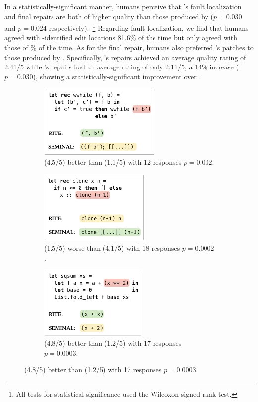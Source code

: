 %
In a statistically-significant manner, humans perceive that
\toolname's fault localization and final repairs are both
of higher quality than those produced by \seminal ($p=0.030$
and $p=0.024$ respectively).~\footnote{All tests for statistical
significance used the Wilcoxon signed-rank test.}
%
Regarding fault localization, we find that humans agreed
with \toolname-identified edit locations 81.6\% of the time
but only agreed with those of \% of the time.
%
%
As for the final repair, humans also preferred \toolname's patches
to those produced by \seminal. Specifically, \toolname's repairs
achieved an average quality rating of 2.41/5 while \seminal's
repairs had an average rating of only 2.11/5, a 14\% increase ($p=0.030$),
showing a statistically-significant improvement over \seminal.

\begin{figure}
\begin{subfigure}[t]{.33\textwidth}
\centering
\includegraphics[height=1.4in]{comp1.png}
\caption{\toolname (4.5/5) better than \seminal(1.1/5) with 12 responses $p=0.002$.}
\label{subfig:good1}
\end{subfigure}
\begin{subfigure}[t]{.33\textwidth}
\centering
\includegraphics[height=1.4in]{comp2.png}
\caption{\toolname (1.5/5) worse than \seminal(4.1/5) with 18 responses $p=0.0002$.}
\label{subfig:bad}
\end{subfigure}
\begin{subfigure}[t]{.29\textwidth}
\centering
\includegraphics[height=1.4in]{comp3.png}
\caption{\toolname (4.8/5) better than \seminal(1.2/5) with 17 responses $p=0.0003$.}
\label{subfig:good2}
\end{subfigure}
\end{figure}

